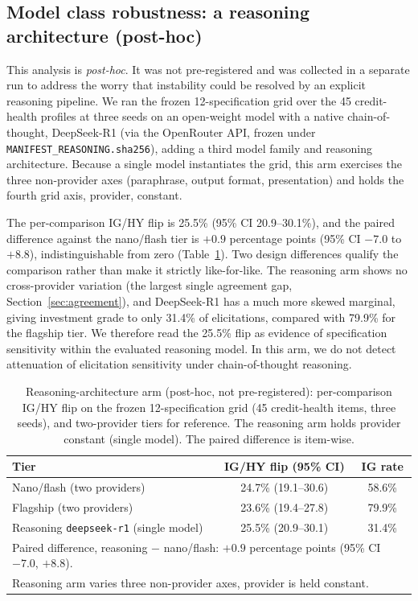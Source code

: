 \documentclass[a4paper,fleqn]{cas-sc}
\begin{document}
\subsection{Model class robustness: a reasoning architecture (post-hoc)}\label{sec:reasoning}
This analysis is \emph{post-hoc}. It was not pre-registered and was collected in a separate run to address
the worry that instability could be resolved by an explicit reasoning pipeline. We ran the frozen
12-specification grid over the 45 credit-health profiles at three seeds on an open-weight model with a
native chain-of-thought, DeepSeek-R1 (via the OpenRouter API, frozen under
\texttt{MANIFEST\_REASONING.sha256}), adding a third model family and reasoning architecture. Because a
single model instantiates the grid, this arm exercises the three non-provider axes (paraphrase, output
format, presentation) and holds the fourth grid axis, provider, constant.

The per-comparison IG/HY flip is 25.5\% (95\% CI 20.9--30.1\%), and the paired difference against the
nano/flash tier is $+0.9$ percentage points (95\% CI $-7.0$ to $+8.8$), indistinguishable from zero
(Table~\ref{tab:reason}). Two design differences qualify the comparison rather than make it strictly
like-for-like. The reasoning arm shows no cross-provider variation (the largest single agreement gap,
Section~\ref{sec:agreement}), and DeepSeek-R1 has a much more skewed marginal, giving
investment grade to only 31.4\% of elicitations, compared with 79.9\% for the flagship tier. We therefore read
the 25.5\% flip as evidence of specification sensitivity within the evaluated reasoning model. In this arm,
we do not detect attenuation of elicitation sensitivity under chain-of-thought reasoning.

\begin{table}[t]\centering
\caption{Reasoning-architecture arm (post-hoc, not pre-registered): per-comparison IG/HY flip on the
frozen 12-specification grid (45 credit-health items, three seeds), and two-provider tiers for
reference. The reasoning arm holds provider constant (single model). The paired difference is item-wise.}
\label{tab:reason}
\begin{tabular}{lcc}\toprule
Tier & IG/HY flip (95\% CI) & IG rate \\\midrule
Nano/flash (two providers) & 24.7\% (19.1--30.6) & 58.6\% \\
Flagship (two providers) & 23.6\% (19.4--27.8) & 79.9\% \\
Reasoning \texttt{deepseek-r1} (single model) & 25.5\% (20.9--30.1) & 31.4\% \\\midrule
\multicolumn{3}{l}{Paired difference, reasoning $-$ nano/flash: $+0.9$ percentage points (95\% CI $-7.0$, $+8.8$).}\\
\multicolumn{3}{l}{Reasoning arm varies three non-provider axes, provider is held constant.}\\\bottomrule
\end{tabular}\end{table}
\end{document}
